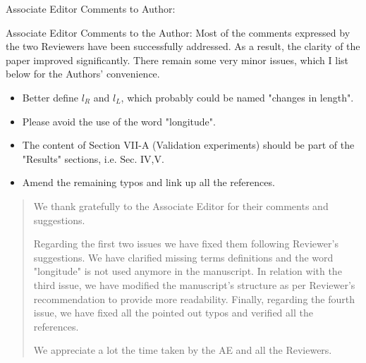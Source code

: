 \documentclass[journal,onecolumn,12pt]{IEEEtran}
\begin{document}
Associate Editor Comments to Author:

Associate Editor
Comments to the Author:
Most of the comments expressed by the two Reviewers have been successfully addressed. As a result, the clarity of the paper improved significantly. There remain some very minor issues, which I list below for the Authors' convenience.

\begin{itemize}
\item Better define $l_R$ and $l_L$, which probably could be named "changes in length".
\item Please avoid the use of the word "longitude".
\item The content of Section VII-A (Validation experiments) should be part of the "Results" sections, i.e. Sec. IV,V.
\item Amend the remaining typos and link up all the references.
\end{itemize}

\begin{quotation}
{\color{blue}
We thank gratefully to the Associate Editor for their comments and suggestions.   

\vspace{10pt} 

Regarding the first two issues we have fixed them following Reviewer's  suggestions.  We have clarified missing terms definitions and the word "longitude" is not used anymore in the manuscript.  In relation with the third issue, we have modified the manuscript's structure as per Reviewer's recommendation to provide more readability.   Finally, regarding the fourth issue, we have fixed all the pointed out typos and verified all the references.

\vspace{10pt} 

We appreciate a lot the time taken by the AE and all the Reviewers.
}
\end{quotation}



\section*{}

\end{document}
